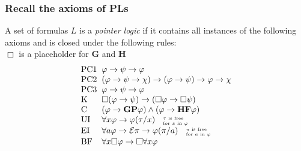 \documentclass[xcolor=x11names]{beamer}
\newcommand{\FD}{\mathbf F}
\newcommand{\FB}{\mathbf G}
\newcommand{\PD}{\mathbf P}
\newcommand{\PB}{\mathbf H}
\newcommand{\lthen}{\rightarrow}
\newenvironment{tomb}[2][.1]{\arraycolsep=#1cm\begin{array}{#2}}{\end{array}}
\begin{document}
%
%

\begin{frame}[t]
\frametitle{Recall the axioms of PLs}
\footnotesize
A set of formulas $L$ is a \emph{pointer logic} if it contains all instances of the following axioms and is closed under the following rules:
\\[1em]{\scriptsize $\Box$ is a placeholder for $\FB$ and $\PB$}
\[\begin{tomb}[.1]{ll}
        \mathrm{PC1} & \varphi \lthen \psi \lthen \varphi
\\      \mathrm{PC2} & (\varphi \lthen \psi \lthen \chi) \lthen (\varphi \lthen \psi ) \lthen \varphi \lthen \chi
\\      \mathrm{PC3} & \varphi \lthen \psi \lthen \varphi
\\      \mathrm{K}   & \Box (\varphi \lthen \psi) \lthen (\Box \varphi \lthen \Box \psi)
\\      \mathrm{C}   & (\varphi \lthen \FB\PD \varphi) \land (\varphi \lthen \PB\FD\varphi)
\\      \mathrm{UI}  & \forall x \varphi \lthen \varphi (\tau/x)
        \textup{ \tiny \begin{tabular}{l}$\tau$ is free \\ for $x$ in $\varphi$ \end{tabular}}
\\      \mathrm{EI}  & \forall a \varphi \lthen \mathcal E \pi \lthen \varphi (\pi /a)
        \textup{ \tiny \begin{tabular}{l}$\pi$ is free \\ for $a$ in $\varphi$ \end{tabular}}
\\      \mathrm{BF}  & \forall x \Box \varphi \lthen \Box \forall x \varphi

\end{tomb}\]
\end{frame}
\end{document}
